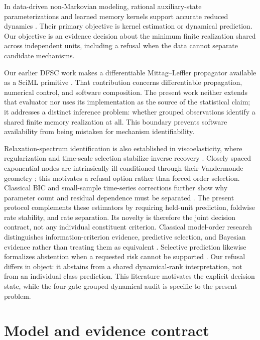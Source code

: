 \documentclass[11pt]{article}
\begin{document}
In data-driven non-Markovian modeling, rational auxiliary-state parameterizations and learned memory kernels support accurate reduced dynamics \cite{lei2016parameterization,ge2024state,lang2026learning}. Their primary objective is kernel estimation or dynamical prediction. Our objective is an evidence decision about the minimum finite realization shared across independent units, including a refusal when the data cannot separate candidate mechanisms.

Our earlier DFSC work makes a differentiable Mittag--Leffler propagator available as a SciML primitive \cite{hu2026dfsc}. That contribution concerns differentiable propagation, numerical control, and software composition. The present work neither extends that evaluator nor uses its implementation as the source of the statistical claim; it addresses a distinct inference problem: whether grouped observations identify a shared finite memory realization at all. This boundary prevents software availability from being mistaken for mechanism identifiability.

Relaxation-spectrum identification is also established in viscoelasticity, where regularization and time-scale selection stabilize inverse recovery \cite{stankiewicz2023relaxation}. Closely spaced exponential nodes are intrinsically ill-conditioned through their Vandermonde geometry \cite{moitra2015superresolution}; this motivates a refusal option rather than forced order selection. Classical BIC and small-sample time-series corrections further show why parameter count and residual dependence must be separated \cite{schwarz1978bic,hurvich1989timeseries}. The present protocol complements these estimators by requiring held-unit prediction, foldwise rate stability, and rate separation. Its novelty is therefore the joint decision contract, not any individual constituent criterion.
Classical model-order research distinguishes information-criterion evidence, predictive selection, and Bayesian evidence rather than treating them as equivalent \cite{stoica2004modelorder,shao1993crossvalidation,kass1995bayes}. Selective prediction likewise formalizes abstention when a requested risk cannot be supported \cite{geifman2017selective}. Our refusal differs in object: it abstains from a shared dynamical-rank interpretation, not from an individual class prediction. This literature motivates the explicit decision state, while the four-gate grouped dynamical audit is specific to the present problem.

\section{Model and evidence contract}
\end{document}

